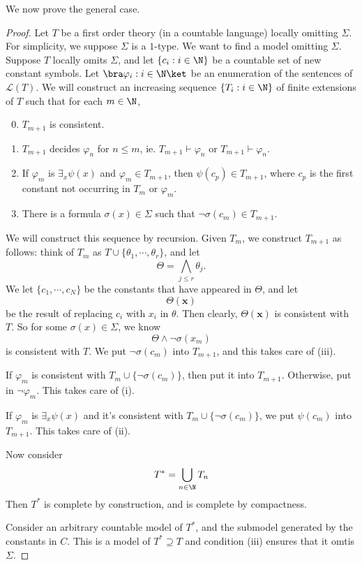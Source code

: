 \documentclass[a4paper]{article}
\begin{document}
We now prove the general case.
\begin{proof}
  Let $T$ be a first order theory (in a countable language) locally omitting $\Sigma$. For simplicity, we suppose $\Sigma$ is a $1$-type. We want to find a model omitting $\Sigma$. Suppose $T$ locally omits $\Sigma$, and let $\{c_i: i \in \N\}$ be a countable set of new constant symbols. Let $\bra \varphi_i: i \in \N\ket$ be an enumeration of the sentences of $\mathcal{L}(T)$. We will construct an increasing sequence $\{ T_i: i \in \N\}$ of finite extensions of $T$ such that for each $m \in \N$,
  \begin{enumerate}\setcounter{enumi}{-1}
    \item $T_{m + 1}$ is consistent. %
    \item $T_{m + 1}$ decides $\varphi_n$ for $n \leq m$, ie. $T_{m + 1} \vdash \varphi_n$ or $T_{m + 1} \vdash \varphi_n$.
    \item If $\varphi_m$ is $\exists_x \psi(x)$ and $\varphi_m \in T_{m + 1}$, then $\psi(c_p) \in T_{m + 1}$, where $c_p$ is the first constant not occurring in $T_m$ or $\varphi_m$.
    \item There is a formula $\sigma(x) \in \Sigma$ such that $\neg \sigma(c_m) \in T_{m + 1}$. %
  \end{enumerate}
  We will construct this sequence by recursion. Given $T_m$, we construct $T_{m + 1}$ as follows: think of $T_m$ as $T \cup \{\theta_1, \cdots, \theta_r\}$, and let
  \[
    \Theta = \bigwedge_{j \leq r} \theta_j.
  \]
  We let $\{c_1, \cdots, c_N\}$ be the constants that have appeared in $\Theta$, and let
  \[
    \Theta(\mathbf{x})
  \]
  be the result of replacing $c_i$ with $x_i$ in $\theta$. Then clearly, $\Theta(\mathbf{x})$ is consistent with $T$. So for some $\sigma(x) \in \Sigma$, we know
  \[
    \Theta \wedge \neg \sigma(x_m)
  \]
  is consistent with $T$. We put $\neg \sigma(c_m)$ into $T_{m + 1}$, and this takes care of (iii).

  If $\varphi_m$ is consistent with $T_m \cup \{\neg \sigma(c_m)\}$, then put it into $T_{m + 1}$. Otherwise, put in $\neg \varphi_m$. This takes care of (i).

  If $\varphi_m$ is $\exists_x \psi(x)$ and it's consistent with $T_m \cup \{\neg \sigma(c_m)\}$, we put $\psi(c_m)$ into $T_{m + 1}$. This takes care of (ii).

  Now consider
  \[
    T^* = \bigcup_{n \in \N} T_n
  \]
  Then $T^*$ is complete by construction, and is complete by compactness.
  
  Consider an arbitrary countable model of $T^*$, and the submodel generated by the constants in $C$. This is a model of $T^* \supseteq T$ and condition (iii) ensures that it omtis $\Sigma$.
\end{proof}
\end{document}
